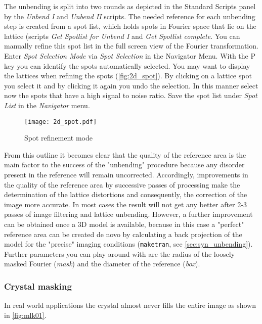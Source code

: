 The unbending is split into two rounds as depicted in the Standard Scripts panel by the \textit{Unbend I} and \textit{Unbend II} scripts. The needed reference for each unbending step is created from a spot list, which holds spots in Fourier space that lie on the lattice (scripts \textit{Get Spotlist for Unbend I} and \textit{Get Spotlist complete}. You can manually refine this spot list in the full screen view of the Fourier transformation. Enter \textit{Spot Selection Mode} via \textit{Spot Selection} in the Navigator Menu. With the P key you can identify the spots automatically selected. You may want to display the lattices when refining the spots (\autoref{fig:2d_spot}). By clicking on a lattice spot you select it and by clicking it again you undo the selection. In this manner select now the spots that have a high signal to noise ratio.
Save the spot list under \textit{Spot List} in the \textit{Navigator} menu.
	
	\begin{figure}[H]
		\centering
		\texttt{[image: 2d\_spot.pdf]}
		\caption{Spot refinement mode}
		\label{fig:2d_spot}
	\end{figure}


From this outline it becomes clear that the quality of the reference area is the main factor to the success of the "unbending" procedure because any disorder present in the reference will remain uncorrected. Accordingly, improvements in the quality of the reference area by successive passes of processing make the determination of the lattice distortions and consequently, the correction of the image more accurate. In most cases the result will not get any better after 2-3 passes of image filtering and lattice unbending. However, a further improvement can be obtained once a 3D model is available, because in this case a "perfect" reference area can be created de novo by calculating a back projection of the model for the "precise" imaging conditions (\texttt{maketran}, see \autoref{sec:syn_unbending}). Further parameters you can play around with are the radius of the loosely masked Fourier (\textit{mask}) and the diameter of the reference (\textit{box}).

	
\newpage

\subsubsection{Crystal masking}
\label{sec:masking}

In real world applications the crystal almost never fills the entire image as shown in \autoref{fig:mlk01}.

